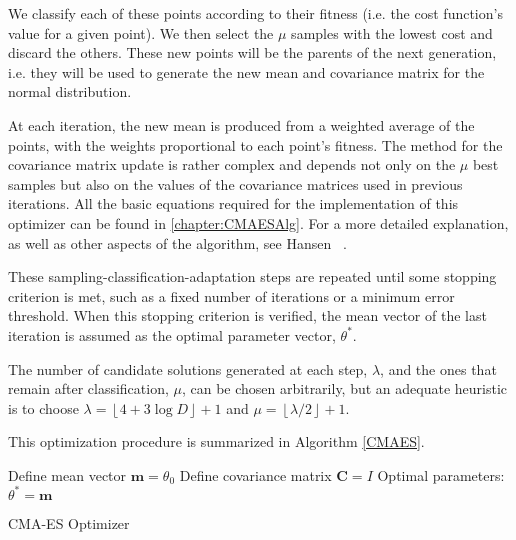 We classify each of these points according to their fitness (i.e. the cost function's value for a given point). We then select the $\mu$ samples with the lowest cost and discard the others. These new points will be the parents of the next generation, i.e. they will be used to generate the new mean and covariance matrix for the normal distribution.



At each iteration, the new mean is produced from a weighted average of the points, with the weights proportional to each point's fitness.
The method for the covariance matrix update is rather complex and depends not only on the $\mu$ best samples but also on the values of the covariance matrices used in previous iterations. All the basic equations required for the implementation of this optimizer can be found in \autoref{chapter:CMAESAlg}. For a more detailed explanation, as well as other aspects of the algorithm, see Hansen ~\citep{Hansen}.

These sampling-classification-adaptation steps are repeated until some stopping criterion is met, such as a fixed number of iterations or a minimum error threshold.
When this stopping criterion is verified, the mean vector of the last iteration is assumed as the optimal parameter vector, $\theta^{*}$.


The number of candidate solutions generated at each step, $\lambda$, and the ones that remain after classification, $\mu$, can be chosen arbitrarily, but an adequate heuristic is to choose $\lambda=\left\lfloor4+3\log D\right\rfloor+1$ and $\mu=\left\lfloor\lambda/2\right\rfloor+1$.

\vfill
\newpage

This optimization procedure is summarized in Algorithm \ref{CMAES}.

\begin{algorithm}[H]\label{CMAES}
\DontPrintSemicolon
Define mean vector $\mathbf{m}=\theta_0$
Define covariance matrix $\mathbf{C}=I$\;
 Optimal parameters: $\theta^{*}=\mathbf{m}$\;
 \caption{CMA-ES Optimizer}
\end{algorithm}
\

